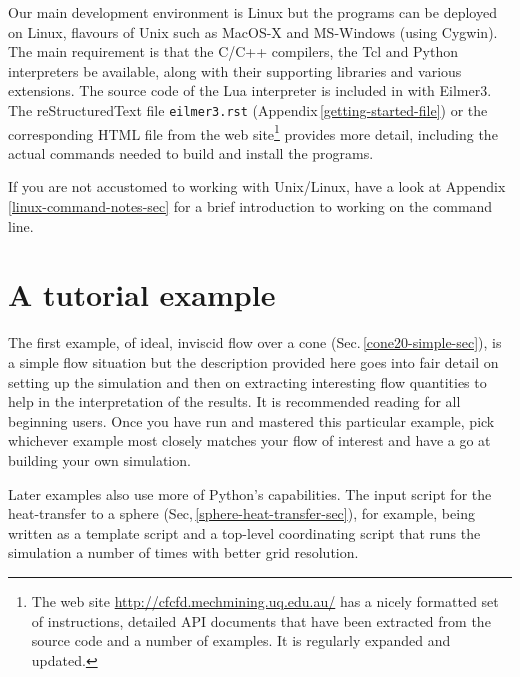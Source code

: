 \documentclass[12pt,a4paper,twoside]{article}
\begin{document}
\medskip
Our main development environment is Linux but the programs can be deployed on
Linux, flavours of Unix such as MacOS-X and MS-Windows (using Cygwin).
The main requirement is that the C/C++ compilers, the Tcl and Python
interpreters be available, along with their supporting libraries and 
various extensions. 
The source code of the Lua interpreter is included in with Eilmer3.
The reStructuredText file \texttt{eilmer3.rst} (Appendix\,\ref{getting-started-file}) 
or the corresponding HTML file from the web site\footnote{The web site 
\url{http://cfcfd.mechmining.uq.edu.au/} has a nicely formatted set of instructions,
detailed API documents that have been extracted from the source code and 
a number of examples.  It is regularly expanded and updated.}
provides more detail, including the actual commands needed to build and install the programs.

\medskip
If you are not accustomed to working with Unix/Linux, 
have a look at Appendix\,\ref{linux-command-notes-sec}
for a brief introduction to working on the command line.




 
\cleardoublepage

\part{A tutorial example}
%
The first example, of ideal, inviscid flow over a cone (Sec.\,\ref{cone20-simple-sec}), 
is a simple flow situation but the description provided here goes into fair detail 
on setting up the simulation and then on extracting interesting flow quantities 
to help in the interpretation of the results. 
It is recommended reading for all beginning users.
Once you have run and mastered this particular example, 
pick whichever example most closely matches your flow of interest 
and have a go at building your own simulation.

\medskip
Later examples also use more of Python's capabilities.
The input script for the heat-transfer to a sphere (Sec,\,\ref{sphere-heat-transfer-sec}), 
for example, being written as a template script and a top-level 
coordinating script that runs the simulation a number of times with better grid resolution.


\cleardoublepage
\end{document}
